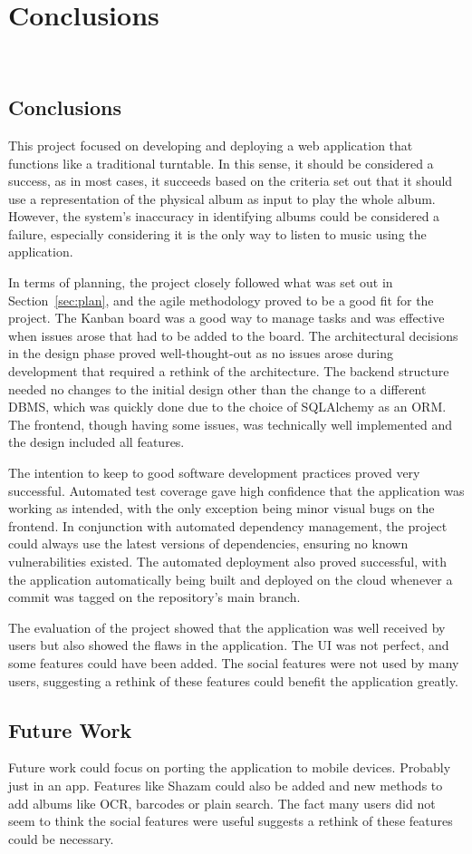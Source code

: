 \chapter{Conclusions}~\label{cha:conclusion}

\section{Conclusions}
This project focused on developing and deploying a web application that functions like a traditional turntable. In this sense, it should be considered a success, as in most cases, it succeeds based on the criteria set out that it should use a representation of the physical album as input to play the whole album. However, the system's inaccuracy in identifying albums could be considered a failure, especially considering it is the only way to listen to music using the application.

In terms of planning, the project closely followed what was set out in Section~\ref{sec:plan}, and the agile methodology proved to be a good fit for the project. The Kanban board was a good way to manage tasks and was effective when issues arose that had to be added to the board. The architectural decisions in the design phase proved well-thought-out as no issues arose during development that required a rethink of the architecture. The backend structure needed no changes to the initial design other than the change to a different DBMS, which was quickly done due to the choice of SQLAlchemy as an ORM. The frontend, though having some issues, was technically well implemented and the design included all features.

The intention to keep to good software development practices proved very successful. Automated test coverage gave high confidence that the application was working as intended, with the only exception being minor visual bugs on the frontend. In conjunction with automated dependency management, the project could always use the latest versions of dependencies, ensuring no known vulnerabilities existed. The automated deployment also proved successful, with the application automatically being built and deployed on the cloud whenever a commit was tagged on the repository's main branch.

The evaluation of the project showed that the application was well received by users but also showed the flaws in the application. The UI was not perfect, and some features could have been added. The social features were not used by many users, suggesting a rethink of these features could benefit the application greatly.

\section{Future Work}
Future work could focus on porting the application to mobile devices. Probably just in an app.
Features like Shazam could also be added and new methods to add albums like OCR, barcodes or plain search.
The fact many users did not seem to think the social features were useful suggests a rethink of these features could be necessary.
